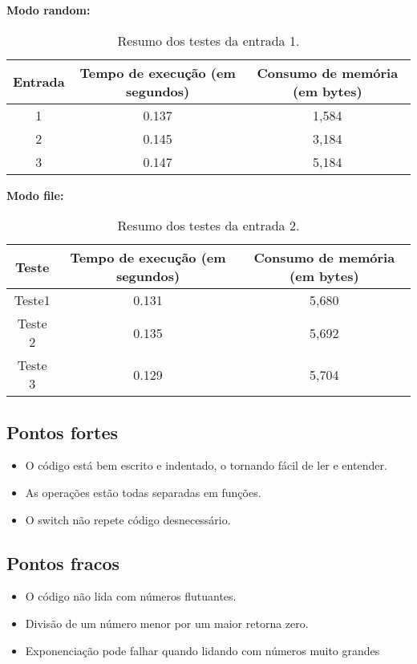 \documentclass{article}
\begin{document}
\noindent \textbf{Modo random:}
\begin{table}[!htb]
    \centering
    \begin{tabular}{|c | c | c |}
        \hline
        Entrada & Tempo de execução (em segundos) & Consumo de memória (em bytes) \\\hline
        1 & 0.137 & 1,584  \\\hline
        2 & 0.145 & 3,184 \\\hline
        3 & 0.147 & 5,184 \\\hline
    \end{tabular}
    \caption{\label{tab:widgets}Resumo dos testes da entrada 1.}
\end{table}

\noindent \textbf{Modo file:}
\begin{table}[!htb]
    \centering
    \begin{tabular}{|c | c | c |}
        \hline
        Teste & Tempo de execução (em segundos) & Consumo de memória (em bytes) \\\hline
        Teste1 & 0.131 & 5,680  \\\hline
        Teste 2 & 0.135 & 5,692 \\\hline
        Teste 3 & 0.129 & 5,704 \\\hline
    \end{tabular}
    \caption{\label{tab:widgets}Resumo dos testes da entrada 2.}
\end{table}

\subsection{Pontos fortes}
\begin{itemize}
\item O código está bem escrito e indentado, o tornando fácil de ler e entender.
\item As operações estão todas separadas em funções.
\item O switch não repete código desnecessário.
\end{itemize}

\subsection{Pontos fracos}
\begin{itemize}
\item O código não lida com números flutuantes.
\item Divisão de um número menor por um maior retorna zero.
\item Exponenciação pode falhar quando lidando com números muito grandes
\end{itemize}
\end{document}
